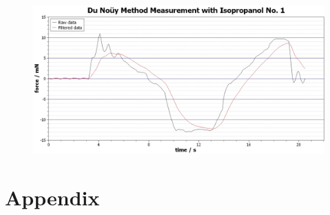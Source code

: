     \begin{figure}[h]
        \centering
        \includegraphics[width=.9\textwidth]{scidavis/Du_Nouy_Method_Measurement_with_isopropanol_No_1.jpg}
        \caption[]{}
        \label{fig:Du_Nouy_Method_Measurement_with_isopropanol_No_1}
    \end{figure}
    \newpage
\chapter{Appendix}
%

\newpage

\newpage

